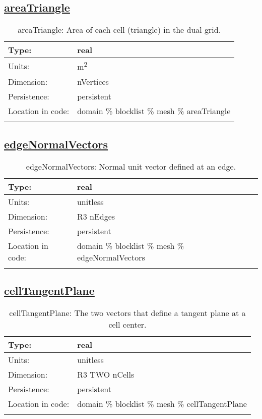 \subsection[areaTriangle]{\hyperref[sec:var_tab_mesh]{areaTriangle}}
\label{subsec:var_sec_mesh_areaTriangle}
\begin{center}
\begin{longtable}{| p{2.0in} | p{4.0in} |}
        \hline 
        Type: & real \\
        \hline 
        Units: & \si{m^2} \\
        \hline 
        Dimension: & nVertices \\
        \hline 
        Persistence: & persistent \\
        \hline 
         Location in code: & domain \% blocklist \% mesh \% areaTriangle \\
         \hline 
    \caption{areaTriangle: Area of each cell (triangle) in the dual grid.}
\end{longtable}
\end{center}
\subsection[edgeNormalVectors]{\hyperref[sec:var_tab_mesh]{edgeNormalVectors}}
\label{subsec:var_sec_mesh_edgeNormalVectors}
\begin{center}
\begin{longtable}{| p{2.0in} | p{4.0in} |}
        \hline 
        Type: & real \\
        \hline 
        Units: & \si{unitless} \\
        \hline 
        Dimension: & R3 nEdges \\
        \hline 
        Persistence: & persistent \\
        \hline 
         Location in code: & domain \% blocklist \% mesh \% edgeNormalVectors \\
         \hline 
    \caption{edgeNormalVectors: Normal unit vector defined at an edge.}
\end{longtable}
\end{center}
\subsection[cellTangentPlane]{\hyperref[sec:var_tab_mesh]{cellTangentPlane}}
\label{subsec:var_sec_mesh_cellTangentPlane}
\begin{center}
\begin{longtable}{| p{2.0in} | p{4.0in} |}
        \hline 
        Type: & real \\
        \hline 
        Units: & \si{unitless} \\
        \hline 
        Dimension: & R3 TWO nCells \\
        \hline 
        Persistence: & persistent \\
        \hline 
         Location in code: & domain \% blocklist \% mesh \% cellTangentPlane \\
         \hline 
    \caption{cellTangentPlane: The two vectors that define a tangent plane at a cell center.}
\end{longtable}
\end{center}

